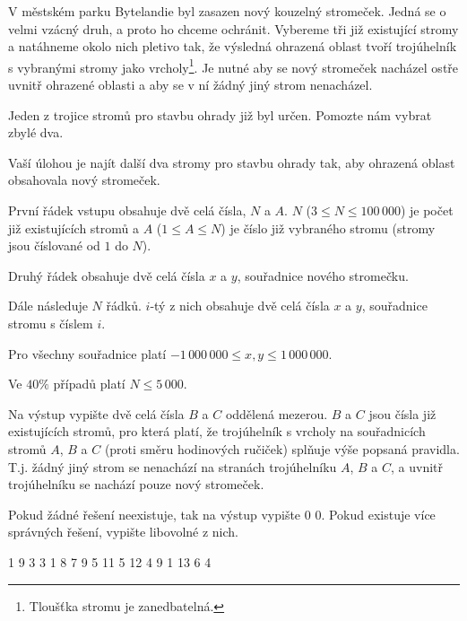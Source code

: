 





V městském parku Bytelandie byl zasazen nový kouzelný stromeček.
Jedná se o velmi vzácný druh, a proto ho chceme ochránit.
Vybereme tři již existující stromy a natáhneme okolo nich pletivo tak,
že výsledná ohrazená oblast tvoří trojúhelník s vybranými stromy jako vrcholy\footnote{Tloušťka stromu je zanedbatelná.}.
Je nutné aby se nový stromeček nacházel ostře uvnitř ohrazené oblasti a aby se v
ní žádný jiný strom nenacházel.

Jeden z trojice stromů pro stavbu ohrady již byl určen. Pomozte nám vybrat zbylé dva.


Vaší úlohou je najít další dva stromy pro stavbu ohrady tak, aby ohrazená oblast
obsahovala nový stromeček.


První řádek vstupu obsahuje dvě celá čísla, $N$ a $A$.
$N$ ($3 \leq N \leq 100\,000$) je počet již existujících stromů a $A$ ($1 \leq A \leq N$)
je číslo již vybraného stromu (stromy jsou číslované od $1$ do $N$).

Druhý řádek obsahuje dvě celá čísla $x$ a $y$, souřadnice nového stromečku.

Dále následuje $N$ řádků. $i$-tý z nich obsahuje dvě celá čísla $x$ a $y$, souřadnice stromu s číslem $i$.

Pro všechny souřadnice platí $-1\,000\,000 \leq x,y \leq 1\,000\,000$.

\smallskip

Ve $40 \%$ případů platí $N \leq 5\,000$.


Na výstup vypište dvě celá čísla $B$ a $C$ oddělená mezerou.
$B$ a $C$ jsou čísla již existujících stromů, pro která platí, že trojúhelník
s vrcholy na souřadnicích stromů $A$, $B$ a $C$ (proti směru hodinových ručiček) splňuje výše popsaná pravidla.
T.j. žádný jiný strom se nenachází na stranách trojúhelníku $A$, $B$ a $C$, a uvnitř trojúhelníku se nachází pouze nový stromeček.


Pokud žádné řešení neexistuje, tak na výstup vypište 0 0.
Pokud existuje více správných řešení, vypište libovolné z nich.


 1
9 3
3 1
8 7
9 5
11 5
12 4
9 1
13 6
 4
\sampleCOMMENT

\sampleEND


